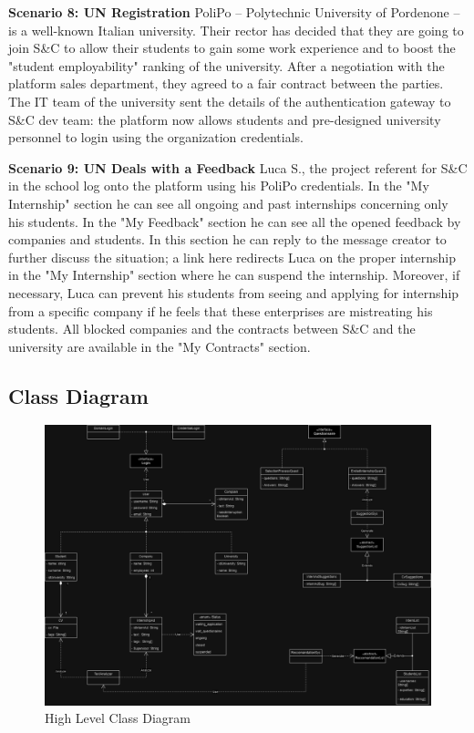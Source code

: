\par{\textbf{Scenario 8: UN Registration}} PoliPo – Polytechnic University of Pordenone – is a well-known Italian
university. Their rector has decided that they are going to join S\&C to allow their students to gain some work
experience and to boost the "student employability" ranking of the university. After a negotiation with the platform
sales department, they agreed to a fair contract between the parties. The IT team of the university sent the details of
the authentication gateway to S\&C dev team: the platform now allows students and pre-designed university personnel to
login using the organization credentials.

\par{\textbf{Scenario 9: UN Deals with a Feedback}} Luca S., the project referent for S\&C in the school log onto the
platform using his PoliPo credentials. In the "My Internship" section he can see all ongoing and past internships
concerning only his students. In the "My Feedback" section he can see all the opened feedback by companies and
students. In this section he can reply to the message creator to further discuss the situation; a link here redirects
Luca on the proper internship in the "My Internship" section where he can suspend the internship.
Moreover, if necessary, Luca can prevent his students from seeing and applying for internship from a specific company
if he feels that these enterprises are mistreating his students. All blocked companies and the contracts between S\&C
and the university are available in the "My Contracts" section.

\subsection{Class Diagram}
\label{sub:class_diagram}%

\begin{figure}[H]
      \centering
      \includegraphics[width=1.0\textwidth]{Images/UML.png}
      \caption{High Level Class Diagram}
      \label{fig:class_diagram}
\end{figure}

